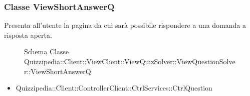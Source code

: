 \subsubsection{Classe ViewShortAnswerQ}
Presenta all'utente la pagina da cui sarà possibile rispondere a una domanda a risposta aperta.
\begin{figure}[H]
\centering
\noindent{}
\caption[Schema Classe ViewShortAnswerQ]{Schema Classe Quizzipedia::Client::ViewClient::ViewQuizSolver::ViewQuestionSolver::ViewShortAnswerQ}
\end{figure}
\begin{itemize}
\item Quizzipedia::Client::ControllerClient::CtrlServices::CtrlQuestion
\end{itemize}
